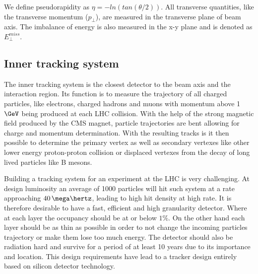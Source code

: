We define pseudorapidity as $\eta = -ln(tan(\theta/2))$. All transverse quantities, like the transverse momentum ($p_\perp$), are measured in the transverse plane of beam axis. The imbalance of energy is also measured in the x-y plane and is denoted as $E^{miss}_\perp$.

\subsection{Inner tracking system}
\label{SUBSECTION:ExperimentalApparatus_CMS_Tracker}

%

The inner tracking system is the closest detector to the beam axis and the interaction region. Its function is to measure the trajectory of all charged particles, like electrons, charged hadrons and muons with momentum above 1 $\GeV$ being produced at each \gls{LHC} collision. With the help of the strong magnetic field produced by the \gls{CMS} magnet, particle trajectories are bent allowing for charge and momentum determination. With the resulting tracks is it then possible to determine the primary vertex as well as secondary vertexes like other lower energy proton-proton collision or displaced vertexes from the decay of long lived particles like B mesons.

Building a tracking system for an experiment at the \gls{LHC} is very challenging. At design luminosity an average of 1000 particles will hit such system at a rate approaching $40\,\mega\hertz$, leading to high hit density at high rate. It is therefore desirable to have a fast, efficient and high granularity detector. Where at each layer the occupancy should be at or below $1\%$. On the other hand each layer should be as thin as possible in order to not change the incoming particles trajectory or make them lose too much energy. The detector should also be radiation hard and survive for a period of at least 10 years due to its importance and location. This design requirements have lead to a tracker design entirely based on silicon detector technology. 

